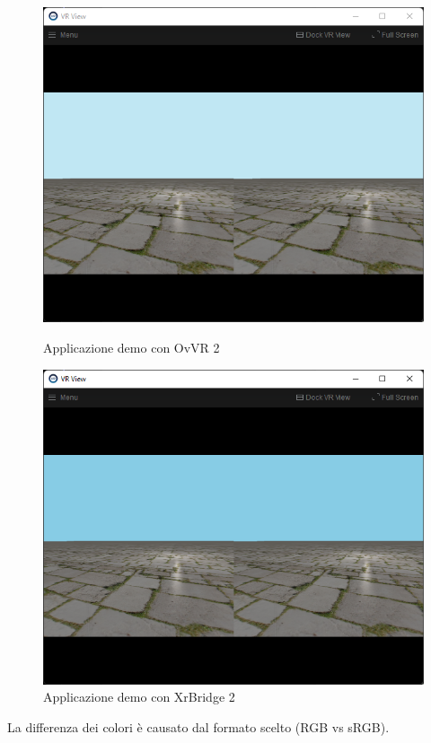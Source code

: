 \documentclass[twoside]{supsistudent}
\begin{document}
\begin{figure}[H]
  \begin{minipage}{.45\textwidth}
    \centering
    \includegraphics[width=.9\linewidth]{resources/demo_ovvr_2.png}
    \caption{Applicazione demo con OvVR 2}
  \end{minipage}
  \begin{minipage}{.45\textwidth}
    \centering
    \includegraphics[width=.9\linewidth]{resources/demo_xrbridge_2.png}
    \caption{Applicazione demo con XrBridge 2}
  \end{minipage}
\end{figure}

La differenza dei colori è causato dal formato scelto (RGB vs sRGB).
\end{document}
